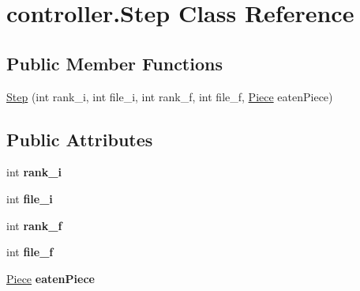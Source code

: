 \hypertarget{classcontroller_1_1Step}{\section{controller.\-Step Class Reference}
\label{classcontroller_1_1Step}
}
\subsection*{Public Member Functions}
\begin{DoxyCompactItemize}
\item 
\hyperlink{classcontroller_1_1Step_ab3820dfaff4db43514df302db0bf78ef}{Step} (int rank\-\_\-i, int file\-\_\-i, int rank\-\_\-f, int file\-\_\-f, \hyperlink{classpiece_1_1Piece}{Piece} eaten\-Piece)
\end{DoxyCompactItemize}
\subsection*{Public Attributes}
\begin{DoxyCompactItemize}
\item 
\hypertarget{classcontroller_1_1Step_ac96c44339141074bf3c11802bc863a41}{int {\bfseries rank\-\_\-i}}\label{classcontroller_1_1Step_ac96c44339141074bf3c11802bc863a41}

\item 
\hypertarget{classcontroller_1_1Step_ae9c6ee95f3b4afa6c54240a7854da92b}{int {\bfseries file\-\_\-i}}\label{classcontroller_1_1Step_ae9c6ee95f3b4afa6c54240a7854da92b}

\item 
\hypertarget{classcontroller_1_1Step_af5900d1d354170b6294ca8040b334d87}{int {\bfseries rank\-\_\-f}}\label{classcontroller_1_1Step_af5900d1d354170b6294ca8040b334d87}

\item 
\hypertarget{classcontroller_1_1Step_aa0b5dab8a2fd16aa91fccfd7598f18d3}{int {\bfseries file\-\_\-f}}\label{classcontroller_1_1Step_aa0b5dab8a2fd16aa91fccfd7598f18d3}

\item 
\hypertarget{classcontroller_1_1Step_a6b919a98e7a389b561a0cfb010a3f41c}{\hyperlink{classpiece_1_1Piece}{Piece} {\bfseries eaten\-Piece}}\label{classcontroller_1_1Step_a6b919a98e7a389b561a0cfb010a3f41c}

\end{DoxyCompactItemize}


